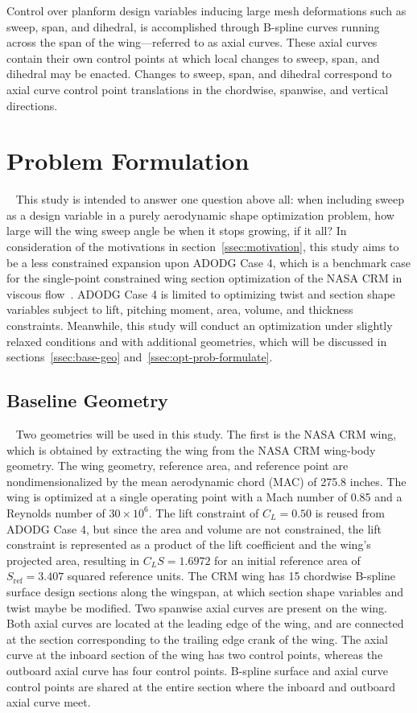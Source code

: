 Control over planform design variables inducing large mesh deformations such as sweep, span, and dihedral, is accomplished through B-spline curves running across the span of the wing—referred to as axial curves. These axial curves contain their own control points at which local changes to sweep, span, and dihedral may be enacted. Changes to sweep, span, and dihedral correspond to axial curve control point translations in the chordwise, spanwise, and vertical directions.
~\section{Problem Formulation}
~\label{ssec-prob-formulate}
This study is intended to answer one question above all: when including sweep as a design variable in a purely aerodynamic shape optimization problem, how large will the wing sweep angle be when it stops growing, if it all?
In consideration of the motivations in section~\ref{ssec:motivation}, this study aims to be a less constrained expansion upon ADODG Case 4, which is a benchmark case for the single-point constrained wing section optimization of the NASA CRM in viscous flow~\cite{koo_investigation_2018, martins_aerodynamic_2022}. ADODG Case 4 is limited to optimizing twist and section shape variables subject to lift, pitching moment, area, volume, and thickness constraints. Meanwhile, this study will conduct an optimization under slightly relaxed conditions and with additional geometries, which will be discussed in sections~\ref{ssec:base-geo} and~\ref{ssec:opt-prob-formulate}.
~\subsection{Baseline Geometry}
~\label{ssec:base-geo}
Two geometries will be used in this study. The first is the NASA CRM wing, which is obtained by extracting the wing from the NASA CRM wing-body geometry. The wing geometry, reference area, and reference point are nondimensionalized by the mean aerodynamic chord (MAC) of 275.8 inches. The wing is optimized at a single operating point with a Mach number of 0.85 and a Reynolds number of $30\times10^6$. The lift constraint of $C_L=0.50$ is reused from ADODG Case 4, but since the area and volume are not constrained, the lift constraint is represented as a product of the lift coefficient and the wing's projected area, resulting in $C_L S=1.6972$ for an initial reference area of $S_{\text{ref}}=3.407$ squared reference units. The CRM wing has 15 chordwise B-spline surface design sections along the wingspan, at which section shape variables and twist maybe be modified. Two spanwise axial curves are present on the wing. Both axial curves are located at the leading edge of the wing, and are connected at the section corresponding to the trailing edge crank of the wing. The axial curve at the inboard section of the wing has two control points, whereas the outboard axial curve has four control points. B-spline surface and axial curve control points are shared at the entire section where the inboard and outboard axial curve meet.

